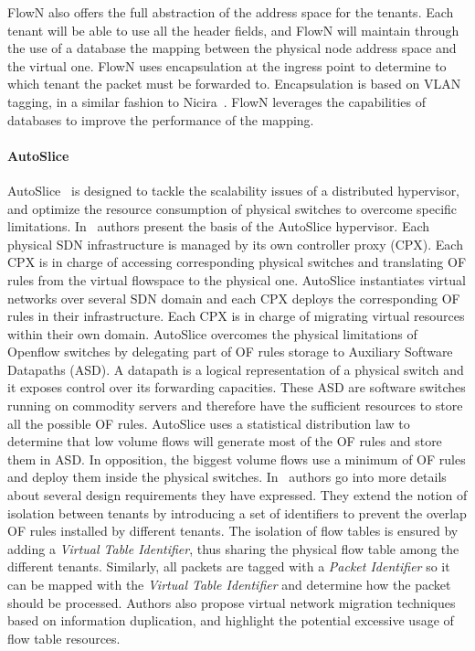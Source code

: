 FlowN also offers the full abstraction of the address space for the tenants.
Each tenant will be able to use all the header fields, and FlowN will maintain through the use of a database the mapping between the physical node address space and the virtual one. FlowN uses encapsulation at the ingress point to determine to which tenant the packet must be forwarded to. Encapsulation is based on VLAN tagging, in a similar fashion to Nicira~\cite{nicira}.   
FlowN leverages the capabilities of databases to improve the performance of the mapping.


\paragraph{AutoSlice}
AutoSlice~\cite{AutoSlice-Bozakov2012} is designed to tackle the scalability issues of a distributed hypervisor, and optimize the resource consumption of physical switches to overcome specific limitations.
In~\cite{AutoSlice-Bozakov2012} authors present the basis of the AutoSlice hypervisor.
Each physical SDN infrastructure is managed by its own controller proxy (CPX).
Each CPX is in charge of accessing corresponding physical switches and translating OF rules from the virtual flowspace to the physical one.
AutoSlice instantiates virtual networks over several SDN domain and each CPX deploys the corresponding OF rules in their infrastructure.
Each CPX is in charge of migrating virtual resources within their own domain.
AutoSlice overcomes the physical limitations of Openflow switches by delegating part of OF rules storage to Auxiliary Software Datapaths (ASD).
A datapath is a logical representation of a physical switch and it exposes control over its forwarding capacities.
These ASD are software switches running on commodity servers and therefore have the sufficient resources to store all the possible OF rules.
AutoSlice uses a statistical distribution law to determine that low volume flows will generate most of the OF rules and store them in ASD. In opposition, the biggest volume flows use a minimum of OF rules and deploy them inside the physical switches.
In~\cite{AutoSlice2-Bozakov2014} authors go into more details about several design requirements they have expressed. They extend the notion of isolation between tenants by introducing a set of identifiers to prevent the overlap OF rules installed by different tenants.
The isolation of flow tables is ensured by adding a \textit{Virtual Table Identifier}, thus sharing the physical flow table among the different tenants.
Similarly, all packets are tagged with a \textit{Packet Identifier} so it can be mapped with the \textit{Virtual Table Identifier} and determine how the packet should be processed.
Authors also propose virtual network migration techniques based on information duplication, and highlight the potential excessive usage of flow table resources.

